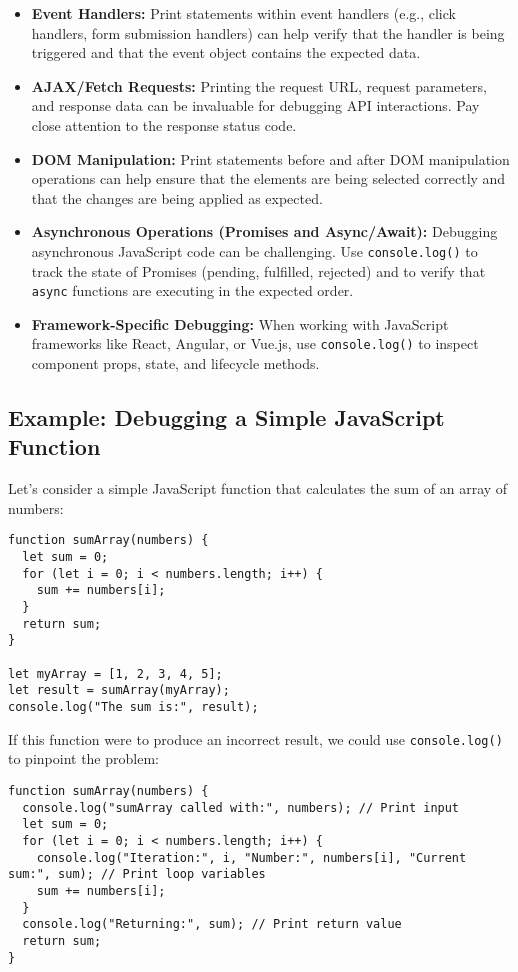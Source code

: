 \documentclass{article}
\begin{document}
{{{{\begin{itemize}
    \item \textbf{Event Handlers:}  Print statements within event handlers (e.g., click handlers, form submission handlers) can help verify that the handler is being triggered and that the event object contains the expected data.
    \item \textbf{AJAX/Fetch Requests:} Printing the request URL, request parameters, and response data can be invaluable for debugging API interactions.  Pay close attention to the response status code.
    \item \textbf{DOM Manipulation:}  Print statements before and after DOM manipulation operations can help ensure that the elements are being selected correctly and that the changes are being applied as expected.
    \item \textbf{Asynchronous Operations (Promises and Async/Await):}  Debugging asynchronous JavaScript code can be challenging. Use \texttt{console.log()} to track the state of Promises (pending, fulfilled, rejected) and to verify that \texttt{async} functions are executing in the expected order.
    \item \textbf{Framework-Specific Debugging:}  When working with JavaScript frameworks like React, Angular, or Vue.js, use \texttt{console.log()} to inspect component props, state, and lifecycle methods.
\end{itemize}

\subsection*{Example: Debugging a Simple JavaScript Function}

Let's consider a simple JavaScript function that calculates the sum of an array of numbers:

\begin{verbatim}
function sumArray(numbers) {
  let sum = 0;
  for (let i = 0; i < numbers.length; i++) {
    sum += numbers[i];
  }
  return sum;
}

let myArray = [1, 2, 3, 4, 5];
let result = sumArray(myArray);
console.log("The sum is:", result);
\end{verbatim}

If this function were to produce an incorrect result, we could use \texttt{console.log()} to pinpoint the problem:

\begin{verbatim}
function sumArray(numbers) {
  console.log("sumArray called with:", numbers); // Print input
  let sum = 0;
  for (let i = 0; i < numbers.length; i++) {
    console.log("Iteration:", i, "Number:", numbers[i], "Current sum:", sum); // Print loop variables
    sum += numbers[i];
  }
  console.log("Returning:", sum); // Print return value
  return sum;
}


\end{verbatim}}}}}
\end{document}
